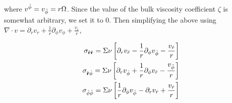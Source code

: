 where $v^{\hat{\phi}}=v_{\hat{\phi}}= r \Omega$. Since the value of the bulk viscosity coefficient $\zeta$ is somewhat arbitrary, 
we set it to 0. Then simplifying the above using $\nabla \cdot v = \partial_r v_r + \frac{1}{r} \partial_{\phi} v_{\phi} + \frac{v_r}{r}$,
\begin{center}
\begin{align}
\sigma_{\hat {\bf r} \hat {\bf r}} = \Sigma \nu \left[  \partial_r v_{\hat{r}} -  \frac{1}{r}\partial_{\phi} v_{\hat{\phi}} -  \frac{v_{\hat{r}}}{r} \right]  \nonumber \\
\sigma_{\hat {\bf r} {\hat{\phi}}} =  \Sigma \nu \left[  \partial_r v_{\hat{\phi}} +  \frac{1}{r}\partial_{\phi} v_{\hat{r}} -  \frac{v_{\hat{\phi}}}{r} \right]  \nonumber \\
\sigma_{{\hat{\phi}} {\hat{\phi}}} = \Sigma \nu \left[   \frac{1}{r}\partial_{\phi} v_{\hat{\phi}} -  \partial_r v_{\hat{r}} + \frac{v_{\hat{r}}}{r} \right] 
\label{OrthComps}
\end{align}
\end{center}


